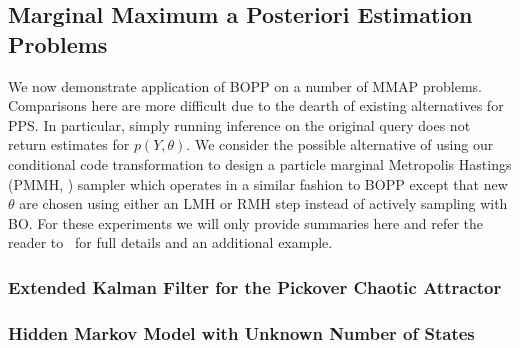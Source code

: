 \subsection{Marginal Maximum a Posteriori Estimation Problems}

We now demonstrate application of BOPP on a number of MMAP problems.  
Comparisons here are more difficult due to the dearth of existing alternatives for PPS.  
In particular, simply running inference on the original query does not return estimates 
for $p\left(Y,\theta\right)$.  We consider the possible alternative of using our 
conditional code transformation to design a particle marginal Metropolis Hastings 
(PMMH, \cite{andrieu2010particle}) sampler which operates in a similar fashion to 
BOPP except that new $\theta$ are chosen using either an LMH or RMH step instead 
of actively sampling with BO. For these experiments we will only provide summaries 
here and refer the reader to~\cite{rainforth2017boppArxiv} for full details and an 
additional example.
%
%
%

\subsubsection{Extended Kalman Filter for the Pickover Chaotic Attractor}
\label{sec:AppKalman}



\subsubsection{Hidden Markov Model with Unknown Number of States}


